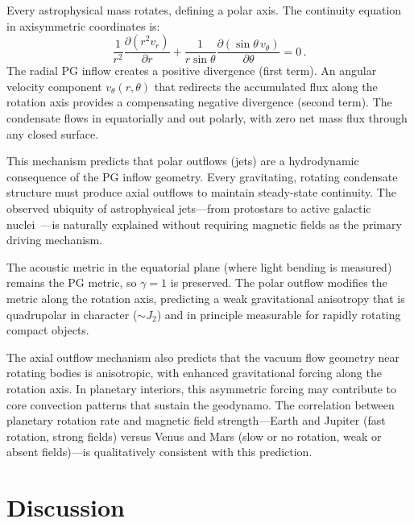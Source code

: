 \documentclass[12pt, a4paper]{article}
\begin{document}
Every astrophysical mass rotates, defining a polar
axis. The continuity equation in axisymmetric
coordinates is:
\begin{equation}
    \frac{1}{r^2}\frac{\partial(r^2 v_r)}{\partial r}
    + \frac{1}{r\sin\theta}
    \frac{\partial(\sin\theta\,v_\theta)}
    {\partial\theta} = 0\,.
\label{eq:continuity_axi}
\end{equation}
The radial PG inflow creates a positive divergence
(first term). An angular velocity component
$v_\theta(r,\theta)$ that redirects the accumulated
flux along the rotation axis provides a compensating
negative divergence (second term). The condensate
flows in equatorially and out polarly, with zero net
mass flux through any closed surface.

This mechanism predicts that polar outflows (jets)
are a hydrodynamic consequence of the PG inflow
geometry. Every gravitating, rotating condensate
structure must produce axial outflows to maintain
steady-state continuity. The observed ubiquity of
astrophysical jets---from protostars to active
galactic nuclei~\cite{blandford_1977}---is naturally
explained without requiring magnetic fields as the
primary driving mechanism.

The acoustic metric in the equatorial plane (where
light bending is measured) remains the PG metric, so
$\gamma = 1$ is preserved. The polar outflow modifies
the metric along the rotation axis, predicting a
weak gravitational anisotropy that is quadrupolar
in character ($\sim J_2$) and in principle measurable
for rapidly rotating compact objects.

The axial outflow mechanism also predicts that the
vacuum flow geometry near rotating bodies is
anisotropic, with enhanced gravitational forcing
along the rotation axis. In planetary interiors, this
asymmetric forcing may contribute to core convection
patterns that sustain the geodynamo. The correlation
between planetary rotation rate and magnetic field
strength---Earth and Jupiter (fast rotation, strong
fields) versus Venus and Mars (slow or no rotation,
weak or absent fields)---is qualitatively consistent
with this prediction.


\section{Discussion}
\label{sec:discussion}
\end{document}
